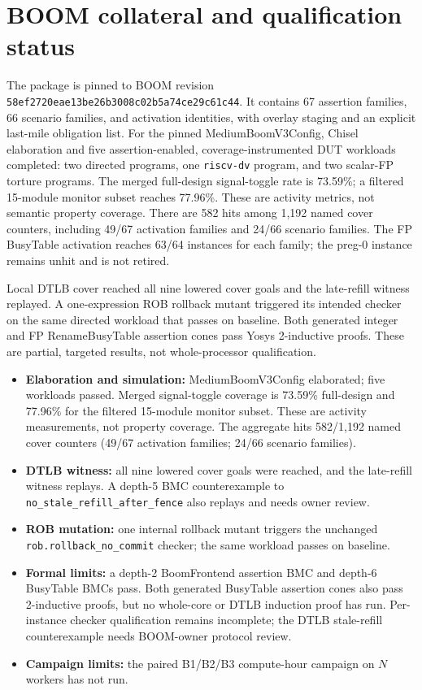\documentclass[conference,letterpaper]{IEEEtran}
\begin{document}
\section{BOOM collateral and qualification status}

The package is pinned to BOOM revision
\texttt{58ef2720eae13be26b3008c02b5a74ce29c61c44}. It contains 67 assertion
families, 66 scenario families, and activation identities, with overlay
staging and an explicit last-mile obligation list. For the pinned
MediumBoomV3Config, Chisel elaboration and five assertion-enabled,
coverage-instrumented DUT workloads completed: two directed programs, one
\texttt{riscv-dv} program, and two scalar-FP torture programs. The merged full-design
signal-toggle rate is 73.59\%; a filtered 15-module monitor subset reaches
77.96\%. These are activity metrics, not semantic property coverage. There
are 582 hits among 1,192 named cover counters, including 49/67 activation
families and 24/66 scenario families. The FP BusyTable activation reaches
63/64 instances for each family; the preg-0 instance remains unhit and is not
retired.

Local DTLB cover reached all nine lowered cover goals and the late-refill
witness replayed. A one-expression ROB rollback mutant triggered its intended
checker on the same directed workload that passes on baseline. Both generated
integer and FP RenameBusyTable assertion cones pass Yosys 2-inductive proofs.
These are partial, targeted results, not whole-processor qualification.

\begin{itemize}
\raggedright
\item \textbf{Elaboration and simulation:} MediumBoomV3Config elaborated; five
  workloads passed. Merged signal-toggle coverage is 73.59\% full-design and
  77.96\% for the filtered 15-module monitor subset. These are activity
  measurements, not property coverage. The aggregate hits 582/1,192 named
  cover counters (49/67 activation families; 24/66 scenario families).
\item \textbf{DTLB witness:} all nine lowered cover goals were reached, and
  the late-refill witness replays. A depth-5 BMC counterexample to
  \texttt{no\_stale\_refill\_after\_fence} also replays and needs owner review.
\item \textbf{ROB mutation:} one internal rollback mutant triggers the
  unchanged \texttt{rob.rollback\_no\_commit} checker; the same workload passes
  on baseline.
\item \textbf{Formal limits:} a depth-2 BoomFrontend assertion BMC and depth-6
  BusyTable BMCs pass. Both generated BusyTable assertion cones also pass
  2-inductive proofs, but no whole-core or DTLB induction proof has run.
  Per-instance checker qualification remains incomplete; the DTLB stale-refill
  counterexample needs BOOM-owner protocol review.
\item \textbf{Campaign limits:} the paired B1/B2/B3 compute-hour campaign on
  $N$ workers has not run.
\end{itemize}
\end{document}
